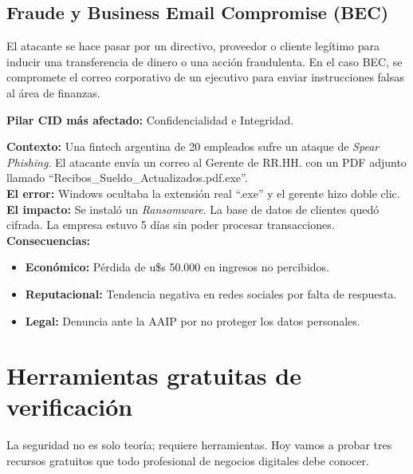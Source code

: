 \documentclass[12pt,a4paper]{article}
\begin{document}
\subsection{Fraude y Business Email Compromise (BEC)}
\begin{cajaAmenaza}
El atacante se hace pasar por un directivo, proveedor o cliente leg\'itimo para inducir una transferencia de dinero o una acci\'on fraudulenta. En el caso BEC, se compromete el correo corporativo de un ejecutivo para enviar instrucciones falsas al \'area de finanzas.
\end{cajaAmenaza}

\textbf{Pilar CID m\'as afectado:} Confidencialidad e Integridad.

\begin{cajaCaso}[title={Caso: La ca\'ida de ``FintechYa''}]
\textbf{Contexto:} Una fintech argentina de 20 empleados sufre un ataque de \emph{Spear Phishing}. El atacante env\'ia un correo al Gerente de RR.HH. con un PDF adjunto llamado ``Recibos\_Sueldo\_Actualizados.pdf.exe''.\\[4pt]
\textbf{El error:} Windows ocultaba la extensi\'on real ``.exe'' y el gerente hizo doble clic.\\[4pt]
\textbf{El impacto:} Se instal\'o un \emph{Ransomware}. La base de datos de clientes qued\'o cifrada. La empresa estuvo 5 d\'ias sin poder procesar transacciones.\\[4pt]
\textbf{Consecuencias:}
\begin{itemize}[leftmargin=1.5em]
    \item \textbf{Econ\'omico:} P\'erdida de u\$s 50.000 en ingresos no percibidos.
    \item \textbf{Reputacional:} Tendencia negativa en redes sociales por falta de respuesta.
    \item \textbf{Legal:} Denuncia ante la AAIP por no proteger los datos personales.
\end{itemize}
\end{cajaCaso}

\newpage
\section{Herramientas gratuitas de verificaci\'on}

La seguridad no es solo teor\'ia; requiere herramientas. Hoy vamos a probar tres recursos gratuitos que todo profesional de negocios digitales debe conocer.
\end{document}
